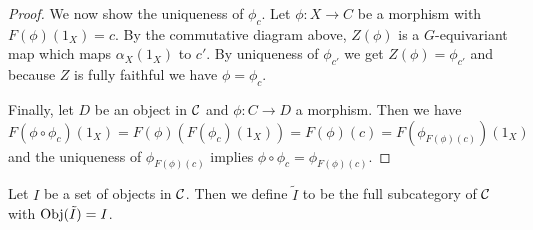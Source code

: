 \begin{proof}
We now show the uniqueness of $\phi_c$. Let $\phi \colon X \to C$ be a morphism with $F(\phi)(1_X) = c$. By the commutative diagram above, $Z(\phi)$ is a $G$-equivariant map which maps $\alpha_X(1_X)$ to $c'$. By uniqueness of $\phi_{c'}$ we get $Z(\phi) = \phi_{c'}$ and because $Z$ is fully faithful we have $\phi = \phi_c$.

Finally, let $D$ be an object in $\mathcal{C}$ and $\phi\colon C \to D$ a morphism. Then we have \[F(\phi \circ \phi_c)(1_X) = F(\phi)(F(\phi_c)(1_X)) = F(\phi)(c) = F(\phi_{F(\phi)(c)})(1_X)\] and the uniqueness of $\phi_{F(\phi)(c)}$ implies $\phi \circ \phi_c = \phi_{F(\phi)(c)}$.
\end{proof}

\begin{defn}
Let $I$ be a set of objects in $\mathcal{C}$. Then we define $\tilde I$ to be the full subcategory of $\mathcal{C}$ with $\operatorname{Obj}(\tilde I) = I$.
\end{defn}

